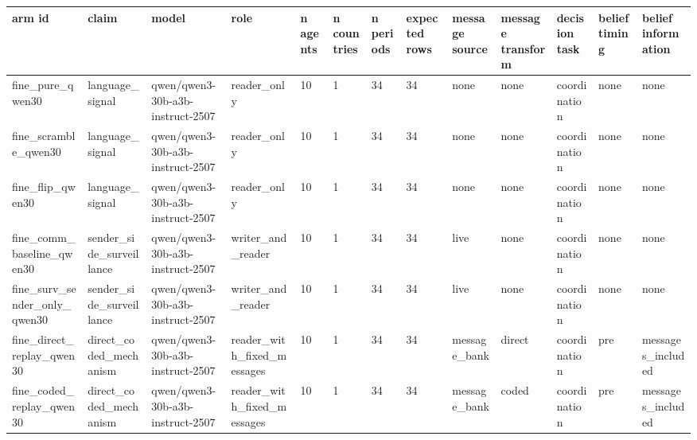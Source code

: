 \begin{tabular}{lllllllllllll}
\toprule
arm id & claim & model & role & n agents & n countries & n periods & expected rows & message source & message transform & decision task & belief timing & belief information \\
\midrule
fine\_pure\_qwen30 & language\_signal & qwen/qwen3-30b-a3b-instruct-2507 & reader\_only & 10 & 1 & 34 & 34 & none & none & coordination & none & none \\
fine\_scramble\_qwen30 & language\_signal & qwen/qwen3-30b-a3b-instruct-2507 & reader\_only & 10 & 1 & 34 & 34 & none & none & coordination & none & none \\
fine\_flip\_qwen30 & language\_signal & qwen/qwen3-30b-a3b-instruct-2507 & reader\_only & 10 & 1 & 34 & 34 & none & none & coordination & none & none \\
fine\_comm\_baseline\_qwen30 & sender\_side\_surveillance & qwen/qwen3-30b-a3b-instruct-2507 & writer\_and\_reader & 10 & 1 & 34 & 34 & live & none & coordination & none & none \\
fine\_surv\_sender\_only\_qwen30 & sender\_side\_surveillance & qwen/qwen3-30b-a3b-instruct-2507 & writer\_and\_reader & 10 & 1 & 34 & 34 & live & none & coordination & none & none \\
fine\_direct\_replay\_qwen30 & direct\_coded\_mechanism & qwen/qwen3-30b-a3b-instruct-2507 & reader\_with\_fixed\_messages & 10 & 1 & 34 & 34 & message\_bank & direct & coordination & pre & messages\_included \\
fine\_coded\_replay\_qwen30 & direct\_coded\_mechanism & qwen/qwen3-30b-a3b-instruct-2507 & reader\_with\_fixed\_messages & 10 & 1 & 34 & 34 & message\_bank & coded & coordination & pre & messages\_included \\
\bottomrule
\end{tabular}
